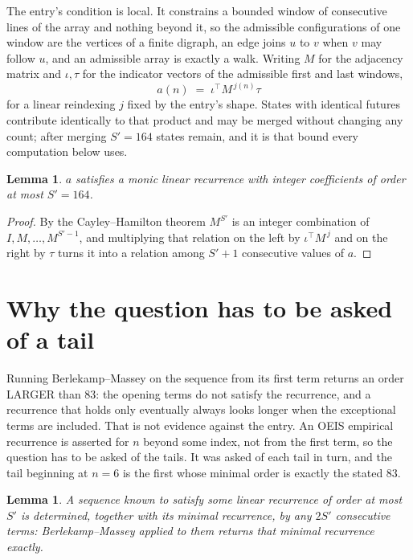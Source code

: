 \documentclass[11pt,a4paper]{article}
\theoremstyle{plain}
\newtheorem{lemma}[theorem]{Lemma}
\theoremstyle{definition}
\begin{document}
The entry's condition is local. It constrains a bounded window of consecutive lines of the
array and nothing beyond it, so the admissible configurations of one window are the vertices of
a finite digraph, an edge joins $u$ to $v$ when $v$ may follow $u$, and an admissible array is
exactly a walk. Writing $M$ for the adjacency matrix and $\iota,\tau$ for the indicator vectors
of the admissible first and last windows,
\[
a(n)\;=\;\iota^{\!\top}M^{\,j(n)}\tau
\]
for a linear reindexing $j$ fixed by the entry's shape. States with identical futures
contribute identically to that product and may be merged without changing any count; after
merging $S'=164$ states remain, and it is that bound every computation below uses.

\begin{lemma}\label{lem:cf}
$a$ satisfies a monic linear recurrence with integer coefficients of order at most $S'=164$.
\end{lemma}

\begin{proof}
By the Cayley--Hamilton theorem $M^{S'}$ is an integer combination of $I,M,\dots,M^{S'-1}$,
and multiplying that relation on the left by $\iota^{\!\top}M^{\,j}$ and on the right by
$\tau$ turns it into a relation among $S'+1$ consecutive values of $a$.
\end{proof}

\section{Why the question has to be asked of a tail}

Running Berlekamp--Massey on the sequence from its first term returns an order LARGER than $83$: the opening terms do not satisfy the recurrence, and a recurrence that holds only eventually always looks longer when the exceptional terms are included. That is not evidence against the entry. An OEIS empirical recurrence is asserted for $n$ beyond some index, not from the first term, so the question has to be asked of the tails. It was asked of each tail in turn, and the tail beginning at $n=6$ is the first whose minimal order is exactly the stated $83$.

\begin{lemma}\label{lem:bm}
A sequence known to satisfy some linear recurrence of order at most $S'$ is determined,
together with its minimal recurrence, by any $2S'$ consecutive terms: Berlekamp--Massey applied
to them returns that minimal recurrence exactly.
\end{lemma}
\end{document}
